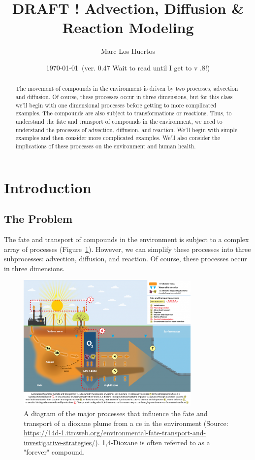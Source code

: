 \documentclass{tufte-handout}\usepackage[]{graphicx}\usepackage[]{xcolor}
\title{DRAFT ! Advection, Diffusion \& Reaction Modeling}
\author{Marc Los Huertos}
\date{\today~(ver. 0.47 Wait to read until I get to v .8!)}
\begin{document}
\maketitle%
\begin{abstract}
The movement of compounds in the environment is driven by two processes, advection and diffusion. Of course, these processes occur in three dimensions, but for this class we'll begin with one dimensional processes before getting to more complicated examples. The compounds are also subject to transformations or reactions. Thus, to understand the fate and transport of compounds in the environment, we need to understand the processes of advection, diffusion, and reaction. We'll begin with simple examples and then consider more complicated examples. We'll also consider the implications of these processes on the environment and human health.

\end{abstract}

\section{Introduction}

\subsection{The Problem}

The fate and transport of compounds in the environment is subject to a complex array of processes (Figure~\ref{fig:dioxaneplume}). However, we can simplify these processes into three subprocesses: 
advection, diffusion, and reaction. Of course, these processes occur in three dimensions. 

\begin{figure}
\centering
\includegraphics[width=0.8\textwidth]{graphics/Dioxane_plume.png}
\caption{A diagram of the major processes that influence the fate and transport of a dioxane plume from a ce in the environment (Source: \url{https://14d-1.itrcweb.org/environmental-fate-transport-and-investigative-strategies/}). 1,4-Dioxane is often referred to as a "forever" compound.}
\label{fig:dioxaneplume}
\end{figure}
\end{document}
